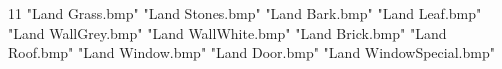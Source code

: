11
"Land Grass.bmp"
"Land Stones.bmp"
"Land Bark.bmp"
"Land Leaf.bmp"
"Land WallGrey.bmp"
"Land WallWhite.bmp"
"Land Brick.bmp"
"Land Roof.bmp"
"Land Window.bmp"
"Land Door.bmp"
"Land WindowSpecial.bmp"
